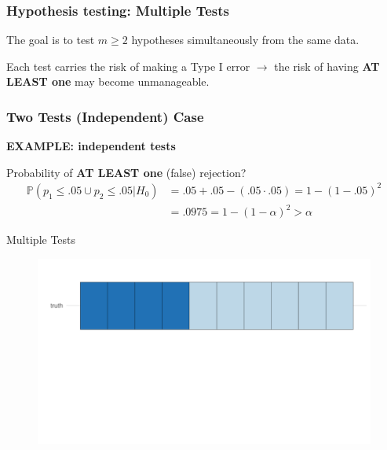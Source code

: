 \documentclass[xcolor={dvipsnames}]{beamer}
\newcommand{\rbf}[1]{\textcolor{redUnipd}{ #1}}
\begin{document}
\begin{frame}
\frametitle{Hypothesis testing: Multiple Tests}

The goal is to test $m \ge 2$ hypotheses simultaneously from the same data.

\bigskip

Each test carries the risk of making a \rbf{Type I error} $\rightarrow$ the risk of having \textbf{ AT LEAST one} may become unmanageable.    
\end{frame}


\begin{frame}
\frametitle{Two Tests (Independent) Case}

\textbf{\rbf{EXAMPLE: independent tests}}

\bigskip

Probability of \textbf{ AT LEAST one} (false) rejection?\
\bigskip
\begin{align*}
\mathbb{P}(p_1\leq .05 \cup p_2\leq .05 | H_0) &= 
.05+.05-(.05\cdot .05)=1-(1-.05)^2 \\
&=.0975=1-(1-\alpha)^2 > \alpha
\end{align*}


\end{frame}

\begin{frame}{Multiple Tests}
    \begin{figure}
        \centering
        \includegraphics[width = \textwidth]{Slides/MTP/plaatjes/mt1.pdf}

    \end{figure}
\end{frame}
\end{document}
